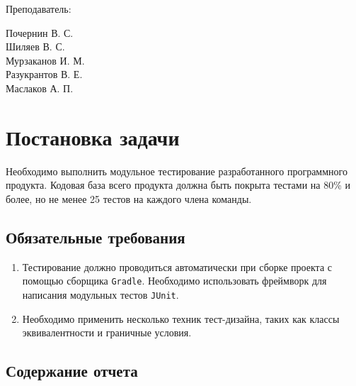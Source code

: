 \documentclass[a4paper, 14pt]{article}
\begin{document}
\begin{titlepage}
\begin{multicols}{2}
\begin{flushright}
            {Преподаватель:\\}

        \end{flushright}
        \begin{flushright}

            {Почернин В. С.}\\
            {Шиляев В. С.}\\
            {Мурзаканов И. М.}\\
            {Разукрантов В. Е.}\\[0.5cm]


            Маслаков А. П.\\

        \end{flushright}
    \end{multicols}

    \flushright{
        {\phantom{qwe}}\\[0.5cm]
    }

    \vfill
\end{titlepage}

\Large
\tableofcontents
\newpage
\large

\section{Постановка задачи}

Необходимо выполнить модульное тестирование разработанного программного продукта. Кодовая база всего продукта должна быть покрыта тестами на 80\% и более, но не менее 25 тестов на каждого члена команды.

\subsection{Обязательные требования}

\begin{enumerate}
    \item Тестирование должно проводиться автоматически при сборке проекта с помощью сборщика \texttt{Gradle}. Необходимо использовать фреймворк для написания модульных тестов \texttt{JUnit}.
    \item Необходимо применить несколько техник тест-дизайна, таких как классы эквивалентности и граничные условия.
\end{enumerate}


\subsection{Содержание отчета}
\end{document}

